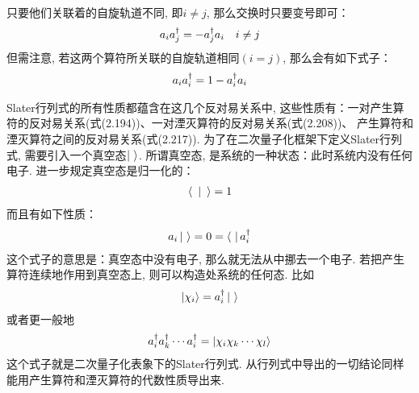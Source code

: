 只要他们关联着的自旋轨道不同, 
即$i\neq j$, 
那么交换时只要变号即可：
\begin{align}
a_ia^\dagger_j = -a^\dagger_ja_i\quad i\neq j
\end{align}
但需注意, 
若这两个算符所关联的自旋轨道相同$(i=j)$, 
那么会有如下式子：
\begin{align}
a_ia^\dagger_i = 1 -a^\dagger_ia_i
\end{align}

Slater行列式的所有性质都蕴含在这几个反对易关系中, 
这些性质有：一对产生算符的反对易关系(式(2.194))、一对湮灭算符的反对易关系(式(2.208))、 产生算符和湮灭算符之间的反对易关系(式(2.217)). 
为了在二次量子化框架下定义Slater行列式, 
需要引入一个真空态$\Ket{\,\,}$. 
所谓真空态, 是系统的一种状态：此时系统内没有任何电子. 进一步规定真空态是归一化的：
\begin{align}
\Braket{\,\,|\,\,} = 1
\end{align} 
而且有如下性质：
\begin{align}
a_i \Ket{\,\,} = 0 = \Bra{\,\,} a^\dagger_i
\end{align}
这个式子的意思是：真空态中没有电子, 
那么就无法从中挪去一个电子. 
若把产生算符连续地作用到真空态上, 
则可以构造处系统的任何态. 
比如
\begin{align}
\Ket{\chi_i} = a^\dagger_i\Ket{\,\,}
\end{align}
或者更一般地
\begin{align}
a^\dagger_ia^\dagger_k\cdots a^\dagger_i = \Ket{\chi_i\chi_k\cdots\chi_l}
\end{align}
这个式子就是二次量子化表象下的Slater行列式. 
从行列式中导出的一切结论同样能用产生算符和湮灭算符的代数性质导出来. 


